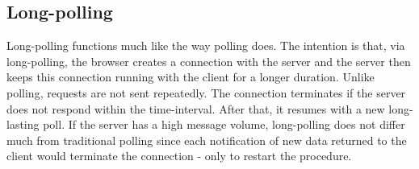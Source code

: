 \subsection{Long-polling}

Long-polling functions much like the way polling does. The intention is 
that, via long-polling, the browser creates a connection with the server 
and the server then keeps this connection running with the client for a 
longer duration. Unlike polling, requests are not sent 
repeatedly. The connection 
terminates if the server does not respond within the time-interval. 
After that, it resumes with a new long-lasting poll. 
If the server has a high message volume, long-polling does not differ much 
from traditional polling since each notification of new data returned to the 
client would terminate the connection - only to restart the 
procedure.\cite{lubbersgreco}